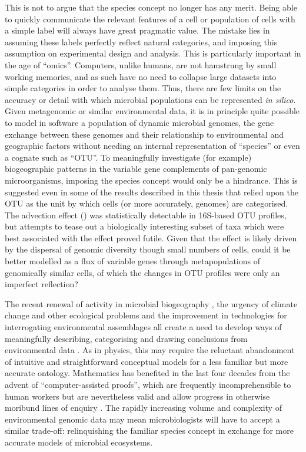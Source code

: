 This is not to argue that the species concept no longer has any merit.
Being able to quickly communicate the relevant features of a cell or population of cells with a simple label will always have great pragmatic value.
The mistake lies in assuming these labels perfectly reflect natural categories, and imposing this assumption on experimental design and analysis.
This is particularly important in the age of ``omics''.
Computers, unlike humans, are not hamstrung by small working memories, and as such have no need to collapse large datasets into simple categories in order to analyse them.
Thus, there are few limits on the accuracy or detail with which microbial populations can be represented \textit{in silico}. 
Given metagenomic or similar environmental data, it is in principle quite possible to model in software a population of dynamic microbial genomes, the gene exchange between these genomes and their relationship to environmental and geographic factors without needing an internal representation of ``species'' or even a cognate such as ``\ac{OTU}''.
To meaningfully investigate (for example) biogeographic patterns in the variable gene complements of pan-genomic microorganisms, imposing the species concept would only be a hindrance.
This is suggested even in some of the results described in this thesis that relied upon the \ac{OTU} as the unit by which cells (or more accurately, genomes) are categorised.
The advection effect () was statistically detectable in 16S-based \ac{OTU} profiles, but attempts to tease out a biologically interesting subset of taxa which were best associated with the effect proved futile.
Given that the effect is likely driven by the dispersal of genomic diversity though small numbers of cells, could it be better modelled as a flux of variable genes through metapopulations of genomically similar cells, of which the changes in \ac{OTU} profiles were only an imperfect reflection?

The recent renewal of activity in microbial biogeography \cite{Ramette:2006jo}, the urgency of climate change and other ecological problems and the improvement in technologies for interrogating environmental assemblages all create a need to develop ways of meaningfully describing, categorising and drawing conclusions from environmental data \cite{Goldenfeld:2007im}.
As in physics, this may require the reluctant abandonment of intuitive and straightforward conceptual models for a less familiar but more accurate ontology.
Mathematics has benefited in the last four decades from the advent of ``computer-assisted proofs'', which are frequently incomprehensible to human workers but are nevertheless valid and allow progress in otherwise moribund lines of enquiry \citep[most famously, the proof of the Kepler conjecture by][]{Hales:2005um}.
The rapidly increasing volume and complexity of environmental genomic data may mean microbiologists will have to accept a similar trade-off: relinquishing the familiar species concept in exchange for more accurate models of microbial ecosystems.

